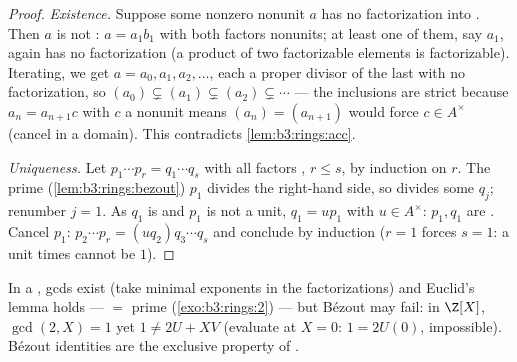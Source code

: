 \begin{proof}
\emph{Existence.} Suppose some nonzero nonunit $a$ has no
factorization into . Then $a$ is not : $a =
a_1b_1$ with both factors nonunits; at least one of them, say
$a_1$, again has no factorization (a product of two factorizable
elements is factorizable). Iterating, we get $a = a_0, a_1, a_2,
\dots$, each a proper divisor of the last with no factorization,
so $(a_0) \subsetneq (a_1) \subsetneq (a_2) \subsetneq \cdots$
--- the inclusions are strict because $a_n = a_{n+1}c$ with $c$ a
nonunit means $(a_n) = (a_{n+1})$ would force $c \in A^\times$
(cancel in a domain). This contradicts \cref{lem:b3:rings:acc}.

\emph{Uniqueness.} Let $p_1 \cdots p_r = q_1 \cdots q_s$ with all
factors , $r \leq s$, by induction on $r$. The prime
(\cref{lem:b3:rings:bezout}) $p_1$ divides the right-hand side, so
divides some $q_j$; renumber $j = 1$. As $q_1$ is  and
$p_1$ is not a unit, $q_1 = u p_1$ with $u \in A^\times$: $p_1,
q_1$ are . Cancel $p_1$: $p_2 \cdots p_r = (u q_2)
q_3\cdots q_s$ and conclude by induction ($r = 1$ forces $s = 1$:
a unit times  cannot be $1$).
\end{proof}

\begin{remark}\label{rem:b3:rings:ufdgcd}
In a , gcds exist (take minimal exponents in the
factorizations) and Euclid's lemma holds ---  $=$ prime
(\cref{exo:b3:rings:2}) --- but B\'ezout may fail: in $\Z[X]$,
$\gcd(2, X) = 1$ yet $1 \neq 2U + XV$ (evaluate at $X = 0$:
$1 = 2U(0)$, impossible). B\'ezout identities are the exclusive
property of .
\end{remark}


